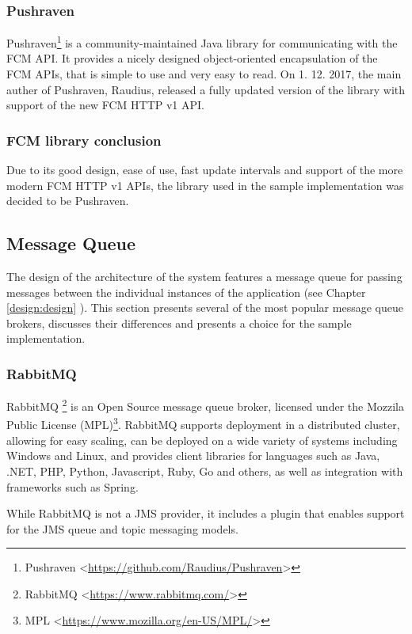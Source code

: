 \subsubsection{Pushraven}
Pushraven\footnote{Pushraven <\url{https://github.com/Raudius/Pushraven}>} is a community-maintained Java library for communicating with the FCM API. It provides a nicely designed object-oriented encapsulation of the FCM APIs, that is simple to use and very easy to read. On 1. 12. 2017, the main auther of Pushraven, Raudius, released a fully updated version of the library with support of the new FCM HTTP v1 API\cite{pushraven-new-api}.

\subsubsection*{FCM library conclusion}
Due to its good design, ease of use, fast update intervals and support of the more modern FCM HTTP v1 APIs, the library used in the sample implementation was decided to be Pushraven.

\subsection{Message Queue}
The design of the architecture of the system features a message queue for passing messages between the individual instances of the application (see Chapter \ref{design:design} ). This section presents several of the most popular message queue brokers, discusses their differences and presents a choice for the sample implementation.

\subsubsection{RabbitMQ}
RabbitMQ \footnote{RabbitMQ <\url{https://www.rabbitmq.com/}>} is an Open Source message queue broker, licensed under the Mozzila Public License (MPL)\footnote{MPL <\url{https://www.mozilla.org/en-US/MPL/}>}. RabbitMQ supports deployment in a distributed cluster, allowing for easy scaling, can be deployed on a wide variety of systems including Windows and Linux, and provides client libraries for languages such as Java, .NET, PHP, Python, Javascript, Ruby, Go and others\cite{rabbitmq-devtools}, as well as integration with frameworks such as Spring.

While RabbitMQ is not a JMS provider, it includes a plugin that enables support for the JMS queue and topic messaging models\cite{rabbitmq-jms}.

